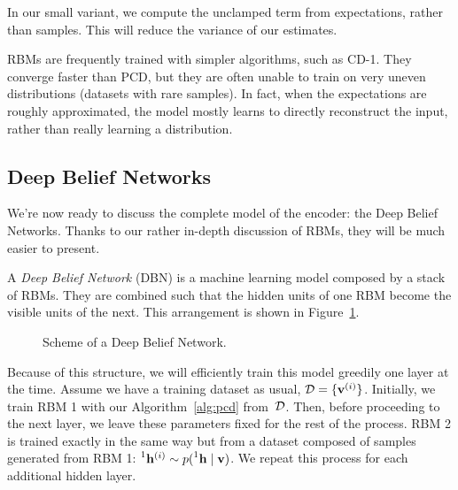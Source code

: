 In our small variant, we compute the unclamped term from expectations, rather
than samples. This will reduce the variance of our estimates.

RBMs are frequently trained with simpler algorithms, such as CD-1. They
converge faster than PCD, but they are often unable to train on very uneven
distributions (datasets with rare samples). In fact, when the expectations are
roughly approximated, the model mostly learns to directly reconstruct the
input, rather than really learning a distribution.


\subsection{Deep Belief Networks}

\label{sec:dbn}

We're now ready to discuss the complete model of the encoder: the Deep Belief
Networks. Thanks to our rather in-depth discussion of RBMs, they will be much
easier to present.

A \emph{Deep Belief Network} (DBN) is a
machine learning model composed by a stack of RBMs. They are combined such
that the hidden units of one RBM become the visible units of the next. This
arrangement is shown in Figure~\ref{fig:dbn}.
\begin{figure}
	\centering
	\caption{Scheme of a Deep Belief Network.}
	\label{fig:dbn}
\end{figure}
Because of this structure, we will efficiently train this model greedily one
layer at the time. Assume we have a training dataset as usual, $\mathcal{D} =
\{\mathbf{v}^{(i)}\}$. Initially, we train RBM 1 with our
Algorithm~\ref{alg:pcd} from~$\mathcal{D}$. Then, before proceeding to the next
layer, we leave these parameters fixed for the rest of the process. RBM 2 is
trained exactly in the same way but from a dataset composed of samples
generated from RBM 1: $\prescript{1}{}{\mathbf{h}}^{(i)} \sim p(\prescript{1}{}{\mathbf{h}}
\mid \mathbf{v})$. We repeat this process for each additional hidden layer.

